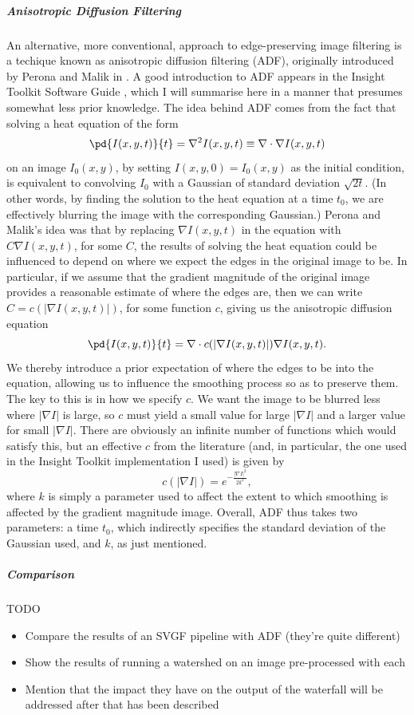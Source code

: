 \subparagraph{Anisotropic Diffusion Filtering}

An alternative, more conventional, approach to edge-preserving image filtering is a techique known as anisotropic diffusion filtering (ADF), originally introduced by Perona and Malik in \cite{perona90}. A good introduction to ADF appears in the Insight Toolkit Software Guide \cite{itk}, which I will summarise here in a manner that presumes somewhat less prior knowledge. The idea behind ADF comes from the fact that solving a heat equation of the form
%
\[
\pd{I(x,y,t)}{t} = \nabla^2 I(x,y,t) \equiv \nabla \cdot \nabla I(x,y,t)
\]
%
on an image $I_0(x,y)$, by setting $I(x,y,0) = I_0(x,y)$ as the initial condition, is equivalent to convolving $I_0$ with a Gaussian of standard deviation $\sqrt{2t}$. (In other words, by finding the solution to the heat equation at a time $t_0$, we are effectively blurring the image with the corresponding Gaussian.) Perona and Malik's idea was that by replacing $\nabla I(x,y,t)$ in the equation with $C \nabla I(x,y,t)$, for some $C$, the results of solving the heat equation could be influenced to depend on where we expect the edges in the original image to be. In particular, if we assume that the gradient magnitude of the original image provides a reasonable estimate of where the edges are, then we can write $C = c(|\nabla I(x,y,t)|)$, for some function $c$, giving us the anisotropic diffusion equation
%
\[
\pd{I(x,y,t)}{t} = \nabla \cdot c(|\nabla I(x,y,t)|) \nabla I(x,y,t).
\]
%
We thereby introduce a prior expectation of where the edges to be into the equation, allowing us to influence the smoothing process so as to preserve them. The key to this is in how we specify $c$. We want the image to be blurred less where $|\nabla I|$ is large, so $c$ must yield a small value for large $|\nabla I|$ and a larger value for small $|\nabla I|$. There are obviously an infinite number of functions which would satisfy this, but an effective $c$ from the literature (and, in particular, the one used in the Insight Toolkit \cite{itk} implementation I used) is given by
%
\[
c(|\nabla I|) = e^{-\frac{|\nabla I|^2}{2k^2}},
\]
%
where $k$ is simply a parameter used to affect the extent to which smoothing is affected by the gradient magnitude image. Overall, ADF thus takes two parameters: a time $t_0$, which indirectly specifies the standard deviation of the Gaussian used, and $k$, as just mentioned.

\subparagraph{Comparison}

TODO

\begin{itemize}
\item Compare the results of an SVGF pipeline with ADF (they're quite different)
\item Show the results of running a watershed on an image pre-processed with each
\item Mention that the impact they have on the output of the waterfall will be addressed after that has been described
\end{itemize}

